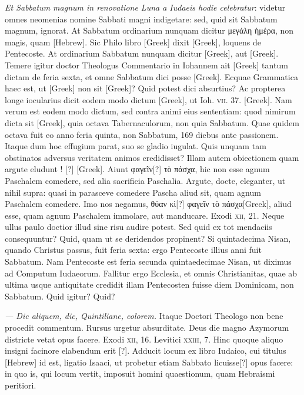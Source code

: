 \begin{parnumbers}
\textit{Et Sabbatum magnum in renovatione Luna a Iudaeis
hodie celebratur}: videtur omnes neomenias nomine Sabbati
magni indigetare: sed, quid sit Sabbatum magnum, ignorat.
\lnr{}At
Sabbatum ordinarium nunquam dicitur \textgreek{μεγάλη ἡμέρα},
 non magis,
quam \texthebrew{[Hebrew]}.
\lnr{}Sic Philo libro \textgreek{[Greek]} dixit \textgreek{[Greek]},
loquens de Pentecoste.
\lnr{}At ordinarium
Sabbatum nunquam dicitur \textgreek{[Greek]}, aut \textgreek{[Greek]}.
\lnr{}Temere igitur
doctor Theologus Commentario in Iohannem ait \textgreek{[Greek]}
tantum dictam de feria sexta, et omne Sabbatum dici posse \textgreek{[Greek]}.
\lnr{}Ecquae Grammatica haec est, ut \textgreek{[Greek]}
non sit \textgreek{[Greek]}?
\lnr{}Quid potest dici absurtius?
\lnr{}Ac propterea
longe iocularius dicit eodem modo dictum \textgreek{[Greek]},
ut Ioh. \textsc{vii}. 37. \textgreek{[Greek]}.
\lnr{}Nam verum est eodem modo dictum, sed
contra animi eius sententiam: quod nimirum dicta sit \textgreek{[Greek]},
quia octava Tabernaculorum, non quia Sabbatum.
\lnr{}Quae quidem
octava fuit eo anno feria quinta, non Sabbatum, 169 diebus ante
passionem.
\lnr{}Itaque dum hoc effugium parat, suo se gladio iugulat.
\lnr{}Quis unquam tam obstinatos adversus veritatem animos credidisset?
\lnr{}Illam autem obiectionem quam argute eludunt ! [?] \textgreek{[Greek]}.
\lnr{}Aiunt \textgreek{φαγεῖν[?] τὸ πάσχα}, hic non esse
agnum Paschalem comedere, sed alia sacrificia Paschalia.
\lnr{}Argute, docte, eleganter, ut nihil supra: quasi in parasceve comedere
Pascha aliud sit, quam agnum Paschalem comedere.
\lnr{}Imo nos negamus, \textgreek{θύαν κὶ[?] φαγεῖν τὸ πάσχα[Greek]},
 aliud esse, quam agnum Paschalem
immolare, aut manducare.
\lnr{}Exodi \textsc{xii}, 21.
\lnr{}Neque ullus paulo doctior illud sine risu audire potest.
\lnr{}Sed quid ex tot mendaciis consequuntur?
\lnr{}Quid, quam ut se deridendos propinent?
\lnr{}Si quintadecima Nisan, quando Christus passus, fuit feria sexta: ergo Pentecoste
illius anni fuit Sabbatum.
\lnr{}Nam Pentecoste est feria secunda
quintaedecimae Nisan, ut diximus ad Computum Iudaeorum.
\lnr{}Fallitur ergo Ecclesia, et omnis Christianitas, quae ab ultima usque
 antiquitate
credidit illam Pentecosten fuisse diem Dominicam, non
Sabbatum.
\lnr{}Quid igitur?
\lnr{}Quid?

\textit{— Dic aliquem, dic, Quintiliane, colorem.}
\lnr{}Itaque Doctori Theologo non bene procedit commentum.
\lnr{}Rursus urgetur absurditate.
\lnr{}Deus die magno Azymorum districte
vetat opus facere.
\lnr{}Exodi \textsc{xii}, 16.
\lnr{}Levitici \textsc{xxiii}, 7.
\lnr{}Hinc quoque
aliquo insigni facinore elabendum erit [?].
\lnr{}Adducit locum ex libro Iudaico,
cui titulus \texthebrew{[Hebrew]} id est, ligatio Isaaci, ut probetur etiam
Sabbato licuisse[?] opus facere: in quo is, qui locum vertit, imposuit homini
quaestionum, quam Hebraismi peritiori.


\end{parnumbers}
